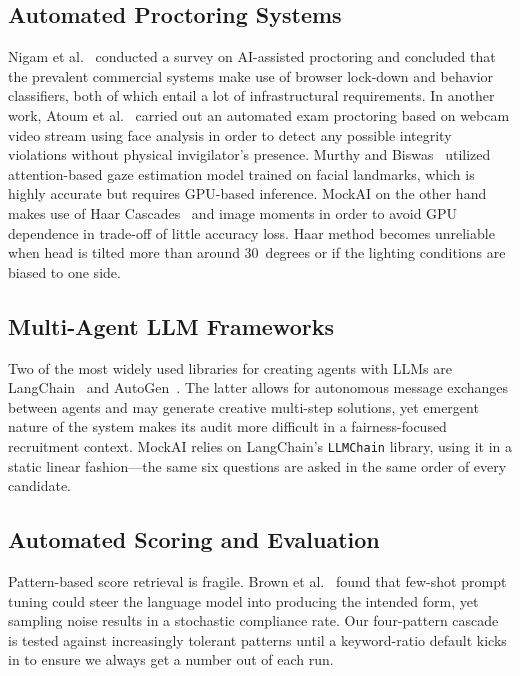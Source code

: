 \documentclass[conference]{IEEEtran}
\begin{document}
\subsection{Automated Proctoring Systems}
Nigam et al.~\cite{nigam2021} conducted a survey on AI-assisted
proctoring and concluded that the prevalent commercial systems make use
of browser lock-down and behavior classifiers, both of which entail a
lot of infrastructural requirements. In another work, Atoum et
al.~\cite{atoum2017} carried out an automated exam proctoring based on
webcam video stream using face analysis in order to detect any possible
integrity violations without physical invigilator's presence. Murthy and
Biswas~\cite{murthy2021} utilized attention-based gaze estimation model
trained on facial landmarks, which is highly accurate but requires
GPU-based inference. MockAI on the other hand makes use of Haar
Cascades~\cite{viola2004} and image moments in order to avoid GPU
dependence in trade-off of little accuracy loss. Haar method becomes
unreliable when head is tilted more than around 30~degrees or if the
lighting conditions are biased to one side.

\subsection{Multi-Agent LLM Frameworks}
Two of the most widely used libraries for creating agents with LLMs are
LangChain~\cite{topsakal2023} and AutoGen~\cite{wu2024}. The latter
allows for autonomous message exchanges between agents and may generate
creative multi-step solutions, yet emergent nature of the system makes
its audit more difficult in a fairness-focused recruitment context.
MockAI relies on LangChain's \texttt{LLMChain} library, using it in a
static linear fashion---the same six questions are asked in the same
order of every candidate.

\subsection{Automated Scoring and Evaluation}
Pattern-based score retrieval is fragile. Brown et al.~\cite{brown2020}
found that few-shot prompt tuning could steer the language model into
producing the intended form, yet sampling noise results in a stochastic
compliance rate. Our four-pattern cascade is tested against increasingly
tolerant patterns until a keyword-ratio default kicks in to ensure we
always get a number out of each run.

\end{document}
